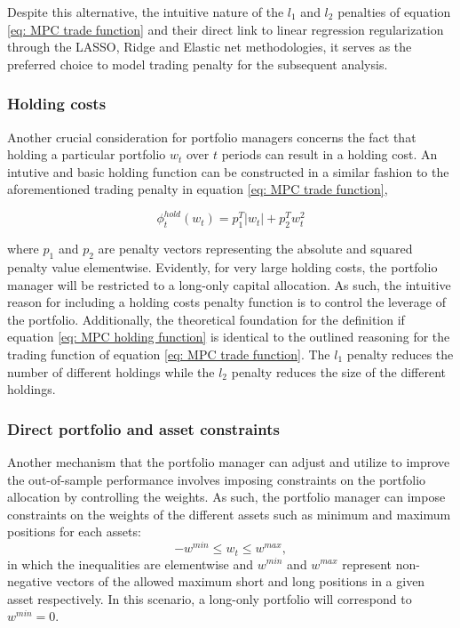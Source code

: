 Despite this alternative, the intuitive nature of the $l_1$ and $l_2$ penalties of equation \ref{eq: MPC trade function} and their direct link to linear regression regularization through the LASSO, Ridge and Elastic net methodologies, it serves as the preferred choice to model trading penalty for the subsequent analysis.

\subsubsection{Holding costs}
Another crucial consideration for portfolio managers concerns the fact that holding a particular portfolio $w_t$ over $t$ periods can result in a holding cost. An intutive and basic holding function can be constructed in a similar fashion to the aforementioned trading penalty in equation \ref{eq: MPC trade function},

\begin{equation}
    \phi_t^{hold}(w_t) = p_1^T|w_t| + p_2^Tw_t^2
    \label{eq: MPC holding function}
\end{equation}

where $p_1$ and $p_2$ are penalty vectors representing the absolute and squared penalty value elementwise. Evidently, for very large holding costs, the portfolio manager will be restricted to a long-only capital allocation. As such, the intuitive reason for including a holding costs penalty function is to control the leverage of the portfolio. Additionally, the theoretical foundation for the definition if equation \ref{eq: MPC holding function} is identical to the outlined reasoning for the trading function of equation \ref{eq: MPC trade function}. The $l_1$ penalty reduces the number of different holdings while the $l_2$ penalty reduces the size of the different holdings.

\subsubsection{ Direct portfolio and asset constraints}
Another mechanism that the portfolio manager can adjust and utilize to improve the out-of-sample performance involves imposing constraints on the portfolio allocation by controlling the weights. As such, the portfolio manager can impose constraints on the weights of the different assets such as minimum and maximum positions for each assets:
\begin{equation}
    -w^{min}\leq w_t\leq w^{max},
\end{equation}
in which the inequalities are elementwise and $w^{min}$ and $w^{max}$ represent non-negative vectors of the allowed maximum short and long positions in a given asset respectively. In this scenario, a long-only portfolio will correspond to $w^{min}=0$.

